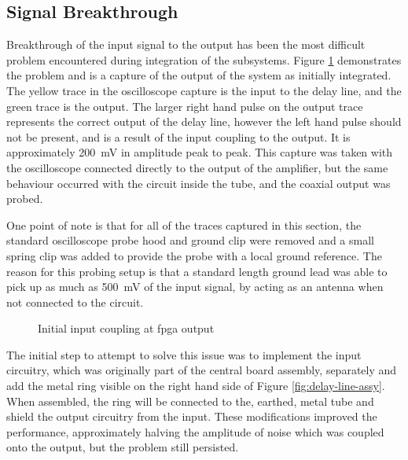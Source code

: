 \subsection{Signal Breakthrough} \label{sec:signal-breakthrough}
Breakthrough of the input signal to the output has been the most difficult problem encountered during integration of the subsystems. Figure \ref{fig:fpga-initial-input-couping} demonstrates the problem and is a capture of the output of the system as initially integrated. The yellow trace in the oscilloscope capture is the input to the delay line, and the green trace is the output. The larger right hand pulse on the output trace represents the correct output of the delay line, however the left hand pulse should not be present, and is a result of the input coupling to the output. It is approximately \SI{200}{\milli\volt} in amplitude peak to peak. This capture was taken with the oscilloscope connected directly to the output of the amplifier, but the same behaviour occurred with the circuit inside the tube, and the coaxial output was probed.

One point of note is that for all of the traces captured in this section, the standard oscilloscope probe hood and ground clip were removed and a small spring clip was added to provide the probe with a local ground reference. The reason for this probing setup is that a standard length ground lead was able to pick up as much as \SI{500}{\milli\volt} of the input signal, by acting as an antenna when not connected to the circuit.

\begin{figure}[ht]
	\centering
	\caption{Initial input coupling at \gls{fpga} output}
	\label{fig:fpga-initial-input-couping}
\end{figure}

The initial step to attempt to solve this issue was to implement the input circuitry, which was originally part of the central board assembly, separately and add the metal ring visible on the right hand side of Figure \ref{fig:delay-line-assy}. When assembled, the ring will be connected to the, earthed, metal tube and shield the output circuitry from the input. These modifications improved the performance, approximately halving the amplitude of noise which was coupled onto the output, but the problem still persisted.

